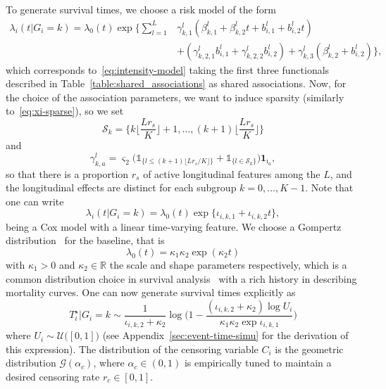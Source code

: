 \documentclass[11pt]{article}
\newcommand{\ind}[1]{\mathds{1}_{#1}}
\newcommand{\cG}{\mathcal G}
\newcommand{\cU}{\mathcal U}
\newcommand{\cS}{\mathcal S}
\newcommand{\R}{\mathds R}
\begin{document}
To generate survival times, we choose a risk model of the form
\begin{align*}
\lambda_i(t|G_i = k) = \lambda_0(t) \exp \Big\{ \sum_{l=1}^L &\gamma_{k,1}^l (\beta_{k,1}^l + \beta_{k,2}^l t + b_{i,1}^l + b_{i,2}^l t) \\
&+ (\gamma_{k,2,1}^l b_{i,1}^l + \gamma_{k,2,2}^l b_{i,2}^l) + \gamma_{k,3}^l (\beta_{k,2}^l + b_{i,2}^l) \Big\},
\end{align*}
which corresponds to~\eqref{eq:intensity-model} taking the first three functionals described in Table~\ref{table:shared_associations} as shared associations.
Now, for the choice of the association parameters, we want to induce sparsity (similarly to~\eqref{eq:xi-sparse}), so we set 
\[\cS_k=\Big\{ k \big\lfloor \dfrac{L r_s}{K} \big\rfloor + 1, \ldots,  (k + 1) \big\lfloor \dfrac{L r_s}{K} \big\rfloor \Big\}\] and
\begin{equation}
  \label{eq:gamma-sparse}
  \gamma_{k,a}^l = \varsigma_2 \big(\ind{\{l \leq (k + 1) \lfloor L r_s/K \rfloor \}} + \ind{\{l \in \cS_k \}} \big) \mathbf{1}_{\imath_a},
\end{equation}
so that there is a proportion $r_s$ of active longitudinal features among the $L$, and the longitudinal effects are distinct for each subgroup $k=0, \ldots, K-1$.
Note that one can write
\[ \lambda_i(t|G_i = k) = \lambda_0(t) \exp \big\{ \iota_{i,k,1} + \iota_{i,k,2} t \big\},\]
being a Cox model with a linear time-varying feature.
We choose a Gompertz distribution~\citep{gompertz1825xxiv} for the baseline, that is
\begin{equation}
  \label{eq:baseline}
  \lambda_0(t) = \kappa_1 \kappa_2 \exp(\kappa_2t)
\end{equation}
with $\kappa_1 > 0$ and $\kappa_2 \in \R$ the scale and shape parameters respectively, which is a common distribution choice in survival analysis~\citep{klein2005survival} with a rich history in describing mortality curves. One can now generate survival times explicitly as
\begin{equation}
  \label{eq:time-generation}
  T_i^\star | G_i=k \sim \dfrac{1}{\iota_{i,k,2} + \kappa_2} \log \Big(1 - \dfrac{(\iota_{i,k,2} + \kappa_2) \log U_i}{\kappa_1 \kappa_2 \exp\iota_{i,k,1}} \Big)
\end{equation}
where $U_i \sim \cU\big([0,1]\big)$ (see Appendix~\ref{sec:event-time-simu} for the derivation of this expression).
The distribution of the censoring variable $C_i$ is the geometric distribution $\cG(\alpha_c)$, where $\alpha_c \in (0, 1)$ is empirically tuned to maintain a desired censoring rate $r_c \in [0,1]$. 
\end{document}
